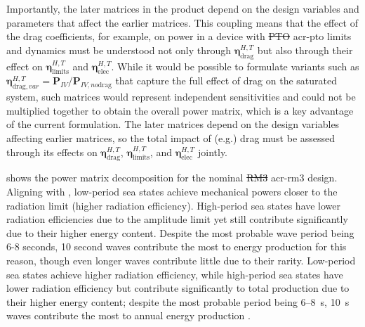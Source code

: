 \documentclass[a4paper,fleqn,colorlinks,unicode,lineno]{cas-dc} %
\makeatletter
\providecommand{\DIFdeltex}[1]{{\protect\color{red}\sout{#1}}} %
\providecommand{\DIFaddbegin}{} %
\providecommand{\DIFaddend}{} %
\providecommand{\DIFdelbegin}{} %
\providecommand{\DIFdelend}{} %
\providecommand{\DIFdel}[1]{\texorpdfstring{\DIFdeltex{#1}}{}} %
\providecommand{\DIFscaledelfig}{0.5}
\newlength{\DIFdelgraphicswidth} %
\newlength{\DIFdelgraphicsheight} %
\providecommand{\DIFaddincludegraphics}[2][]{{\color{blue}\fbox{\DIFOincludegraphics[#1]{#2}}}} %
\providecommand{\DIFdelincludegraphics}[2][]{%
\sbox{\DIFdelgraphicsbox}{\DIFOincludegraphics[#1]{#2}}%
\settoboxwidth{\DIFdelgraphicswidth}{\DIFdelgraphicsbox} %
\settoboxtotalheight{\DIFdelgraphicsheight}{\DIFdelgraphicsbox} %
\scalebox{\DIFscaledelfig}{%
\parbox[b]{\DIFdelgraphicswidth}{\usebox{\DIFdelgraphicsbox}\\[-\baselineskip] \rule{\DIFdelgraphicswidth}{0em}}\llap{\resizebox{\DIFdelgraphicswidth}{\DIFdelgraphicsheight}{%
\setlength{\unitlength}{\DIFdelgraphicswidth}%
\begin{picture}(1,1)%
\thicklines\linethickness{2pt} %
{\color[rgb]{1,0,0}\put(0,0){\framebox(1,1){}}}%
{\color[rgb]{1,0,0}\put(0,0){\line( 1,1){1}}}%
{\color[rgb]{1,0,0}\put(0,1){\line(1,-1){1}}}%
\end{picture}%
}\hspace*{3pt}}} %
} %
\DeclareRobustCommand{\DIFaddbegin}{\DIFOaddbegin \let\includegraphics\DIFaddincludegraphics} %
\DeclareRobustCommand{\DIFaddend}{\DIFOaddend \let\includegraphics\DIFOincludegraphics} %
\DeclareRobustCommand{\DIFdelbegin}{\DIFOdelbegin \let\includegraphics\DIFdelincludegraphics} %
\DeclareRobustCommand{\DIFdelend}{\DIFOaddend \let\includegraphics\DIFOincludegraphics} %
\let\sout@orig\sout %
\renewcommand{\sout}[1]{\ifmmode\text{\sout@orig{\ensuremath{#1}}}\else\sout@orig{#1}\fi} %
\makeatother
\begin{document}
\ifdefined\DISSERTATION
    Importantly, the later matrices in the product depend on the design variables and parameters that affect the earlier matrices.
    This coupling means that the effect of the drag coefficients, for example, on power in a device with \DIFdelbegin \DIFdel{PTO }\DIFdelend \DIFaddbegin \gls{acr-pto} \DIFaddend limits and dynamics must be understood not only through $\mathbf{\eta}^{H,T}_{\text{drag}}$ but also through their effect on $\mathbf{\eta}^{H,T}_{\text{limits}}$ and $\mathbf{\eta}^{H,T}_{\text{elec}}$.
    While it would be possible to formulate variants such as $\mathbf{\eta}^{H,T}_{\text{drag},var} = \mathbf{P}_{IV}/\mathbf{P}_{IV, no \text{drag}}$ that capture the full effect of drag on the saturated system, such matrices would represent independent sensitivities and could not be multiplied together to obtain the overall power matrix, which is a key advantage of the current formulation.
\else
    The later matrices depend on the design variables affecting earlier matrices, so the total impact of (e.g.) drag must be assessed through its effects on $\mathbf{\eta}^{H,T}_{\text{drag}}$, $\mathbf{\eta}^{H,T}_{\text{limits}}$, and $\mathbf{\eta}^{H,T}_{\text{elec}}$ jointly.
\fi

 shows the power matrix decomposition for the nominal \DIFdelbegin \DIFdel{RM3 }\DIFdelend \DIFaddbegin \gls{acr-rm3} \DIFaddend design.
\ifdefined\DISSERTATION
    Aligning with \citet{zou_practical_2023}, low-period sea states achieve mechanical powers closer to the radiation limit (higher radiation efficiency).
    High-period sea states have lower radiation efficiencies due to the amplitude limit yet still contribute significantly due to their higher energy content.
    Despite the most probable wave period being 6-8 seconds, 10 second waves contribute the most to energy production for this reason, though even longer waves contribute little due to their rarity.
\else
    Low-period sea states achieve higher radiation efficiency, while high-period sea states have lower radiation efficiency but contribute significantly to total production due to their higher energy content; despite the most probable period being 6--8~s, 10~s waves contribute the most to annual energy production \citep{zou_practical_2023}.
\fi
\end{document}
